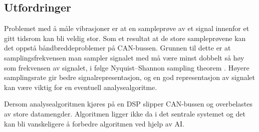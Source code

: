 \subsection{Utfordringer}

Problemet med å måle vibrasjoner er at en sampleprøve av et signal innenfor et gitt tidsrom kan bli veldig stor. Som
et resultat at de store sampleprøvene kan det oppstå båndbreddeproblemer på CAN-bussen. Grunnen til dette
er at samplingsfrekvensen man sampler signalet med må være
minst dobbelt så høy som frekvensen av signalet, i følge Nyquist–Shannon sampling theorem \cite{nyquist}. Høyere
samplingsrate gir bedre signalrepresentasjon, og en god
representasjon av signalet kan være viktig for en eventuell analysealgoritme.

Dersom analysealgoritmen kjøres på en DSP slipper CAN-bussen og overbelastes av store datamengder.
Algoritmen ligger ikke da i det sentrale systemet og det kan bli vanskeligere å forbedre algoritmen ved hjelp av AI. 
